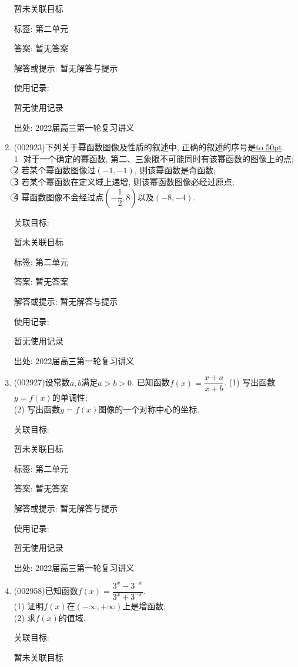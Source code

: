 \documentclass[10pt,a4paper]{article}
\newcommand{\blank}[1]{\underline{\hbox to #1pt{}}}
\begin{document}
\begin{enumerate}[1.]
暂未关联目标



标签: 第二单元

答案: 暂无答案

解答或提示: 暂无解答与提示

使用记录:

暂无使用记录


出处: 2022届高三第一轮复习讲义
\item { (002923)}下列关于幂函数图像及性质的叙述中, 正确的叙述的序号是\blank{50}.\\
\textcircled{1} 对于一个确定的幂函数, 第二、三象限不可能同时有该幂函数的图像上的点;\\
\textcircled{2} 若某个幂函数图像过$(-1,-1)$, 则该幂函数是奇函数;\\
\textcircled{3} 若某个幂函数在定义域上递增, 则该幂函数图像必经过原点;\\
\textcircled{4} 幂函数图像不会经过点$(-\dfrac 12,8)$以及$(-8,-4)$.


关联目标:

暂未关联目标



标签: 第二单元

答案: 暂无答案

解答或提示: 暂无解答与提示

使用记录:

暂无使用记录


出处: 2022届高三第一轮复习讲义
\item { (002927)}设常数$a,b$满足$a>b>0$. 已知函数$f(x)=\dfrac{x+a}{x+b}$.
(1) 写出函数$y=f(x)$的单调性;\\
(2) 写出函数$y=f(x)$图像的一个对称中心的坐标.


关联目标:

暂未关联目标



标签: 第二单元

答案: 暂无答案

解答或提示: 暂无解答与提示

使用记录:

暂无使用记录


出处: 2022届高三第一轮复习讲义
\item { (002958)}已知函数$f(x)=\dfrac{3^x-3^{-x}}{3^x+3^{-x}}$.\\
(1) 证明$f(x)$在$(-\infty,+\infty)$上是增函数;\\
(2) 求$f(x)$的值域.


关联目标:

暂未关联目标




\end{enumerate}
\end{document}
